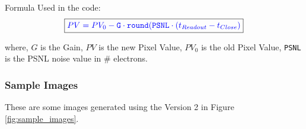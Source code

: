 Formula Used in the code:
\begin{equation}
    \boxed{ \color{blue} PV = PV_0 - \texttt{G} \cdot \texttt{round}(\texttt{PSNL} \cdot (t_{Readout} - t_{Close}) \color{black}}
\end{equation}

where, $G$ is the Gain, $PV$ is the new Pixel Value, $PV_0$ is the old Pixel Value, \texttt{PSNL} is the PSNL noise value in \# electrons.
 
 
\subsubsection{Sample Images}
These are some images generated using the \SISM Version 2 in Figure \ref{fig:sample_images}.

